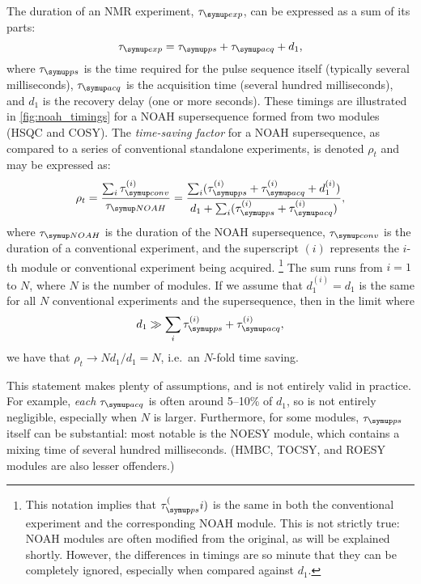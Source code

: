 The duration of an NMR experiment, $\tauexp$, can be expressed as a sum of its parts:
\begin{equation}
    \label{eq:exp_duration_2d}
    \tauexp = \taups + \tauacq + d_1,
\end{equation}
where $\taups$ is the time required for the pulse sequence itself (typically several milliseconds), $\tauacq$ is the acquisition time (several hundred milliseconds), and $d_1$ is the recovery delay (one or more seconds).
These timings are illustrated in \cref{fig:noah_timings} for a NOAH supersequence formed from two modules (HSQC and COSY).
The \textit{time-saving factor} for a NOAH supersequence, as compared to a series of conventional standalone experiments, is denoted $\rho_t$ and may be expressed as:
\begin{equation}
    \label{eq:rho_t}
    \rho_t
    = \frac{\sum_i \tauconv^{(i)}}{\tauNOAH}
    = \frac{{\sum_i (\taups^{(i)} + \tauacq^{(i)} + d_1^{(i)})}}{d_1 + \sum_i (\taups^{(i)} + \tauacq^{(i)})},
\end{equation}
where $\tauNOAH$ is the duration of the NOAH supersequence, $\tauconv$ is the duration of a conventional experiment, and the superscript $(i)$ represents the $i$-th module or conventional experiment being acquired.%
\footnote{This notation implies that $\taups^(i)$ is the same in both the conventional experiment and the corresponding NOAH module. This is not strictly true: NOAH modules are often modified from the original, as will be explained shortly. However, the differences in timings are so minute that they can be completely ignored, especially when compared against $d_1$.}
The sum runs from $i = 1$ to $N$, where $N$ is the number of modules.
If we assume that $d_1^{(i)} = d_1$ is the same for all $N$ conventional experiments and the supersequence, then in the limit where
\begin{equation}
    \label{eq:d1_limit}
    d_1 \gg \sum_i \taups^{(i)} + \tauacq^{(i)},
\end{equation}
we have that $\rho_t \to Nd_1/d_1 = N$, i.e.\ an $N$-fold time saving.

This statement makes plenty of assumptions, and is not entirely valid in practice.
For example, \textit{each} $\tauacq$ is often around 5--10\% of $d_1$, so is not entirely negligible, especially when $N$ is larger.
Furthermore, for some modules, $\taups$ itself can be substantial: most notable is the NOESY module, which contains a mixing time of several hundred milliseconds.
(HMBC, TOCSY, and ROESY modules are also lesser offenders.)

